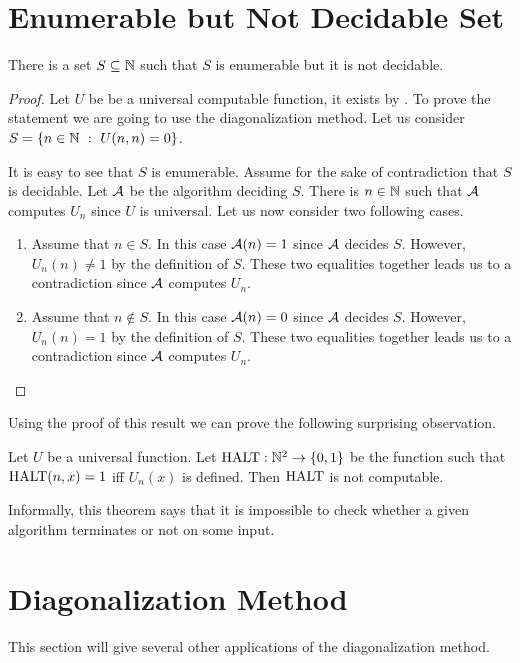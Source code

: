 \section{Enumerable but Not Decidable Set}
\begin{theorem}
\label{theorem:enumerable-not-decidable}
  There is a set $S \subseteq {\mathbb{N}}$ such that $S$ is enumerable but it is not
  decidable.
\end{theorem}
\begin{proof}
  Let $U$ be be a universal computable function, it exists by
  .
  To prove the statement we are going to use the diagonalization method.
  Let us consider $S = \set[U(n, n) = 0]{n \in \N}$.

  It is easy to see that $S$ is enumerable. Assume for the sake of
  contradiction that $S$ is decidable. Let $\mathcal{A}$ be the algorithm
  deciding $S$. There is $n \in {\mathbb{N}}$ such that $\mathcal{A}$ computes $U_n$
  since $U$ is universal. Let us now consider two following cases.
  \begin{enumerate}
    \item Assume that $n \in S$. In this case $\mathcal{A}(n) = 1$ since
      $\mathcal{A}$ decides $S$. However, $U_n(n) \neq 1$ by the definition of
      $S$. These two equalities together leads us to a contradiction since
      $\mathcal{A}$ computes $U_n$.
    \item Assume that $n \notin S$. In this case $\mathcal{A}(n) = 0$ since
      $\mathcal{A}$ decides $S$. However, $U_n(n) = 1$ by the definition of
      $S$. These two equalities together leads us to a contradiction since
      $\mathcal{A}$ computes $U_n$.
  \end{enumerate}
\end{proof}

Using the proof of this result we can prove the following surprising
observation.
\begin{theorem}
\label{theorem:halting}
  Let $U$ be a universal function.
  Let $\Halting : \N^2 \to \set{0, 1}$ be the function such that
  $\mathrm{HALT}(n, x) = 1$ iff $U_n(x)$ is defined. Then $\mathrm{HALT}$ is not
  computable.
\end{theorem}
Informally, this theorem says that it is impossible to check whether a given
algorithm terminates or not on some input.


\section{Diagonalization Method}
This section will give several other applications of the diagonalization method.

